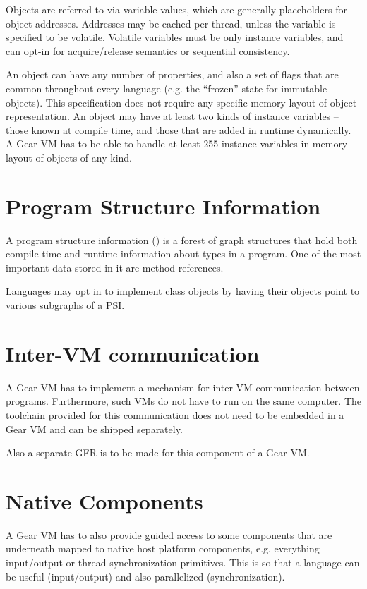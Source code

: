 Objects are referred to via variable values, which are generally placeholders for object addresses. Addresses may be cached per-thread, unless the variable is specified to be volatile. Volatile variables must be only instance variables, and can opt-in for acquire/release semantics or sequential consistency. 

An object can have any number of properties, and also a set of flags that are common throughout every language (e.g. the ``frozen'' state for immutable objects). This specification does not require any specific memory layout of object representation. An object may have at least two kinds of instance variables -- those known at compile time, and those that are added in runtime dynamically. A Gear VM has to be able to handle at least 255 instance variables in memory layout of objects of any kind. 






\section{Program Structure Information}
\label{sec:psi}

A program structure information () is a forest of graph structures that hold both compile-time and runtime information about types in a program. One of the most important data stored in it are method references. 

Languages may opt in to implement class objects by having their objects point to various subgraphs of a PSI. 





\section{Inter-VM communication} %

A Gear VM has to implement a mechanism for inter-VM communication between programs. Furthermore, such VMs do not have to run on the same computer. The toolchain provided for this communication does not need to be embedded in a Gear VM and can be shipped separately. 

Also a separate GFR is to be made for this component of a Gear VM. 





\section{Native Components} %

A Gear VM has to also provide guided access to some components that are underneath mapped to native host platform components, e.g. everything input/output or thread synchronization primitives. This is so that a language can be useful (input/output) and also parallelized (synchronization). 





